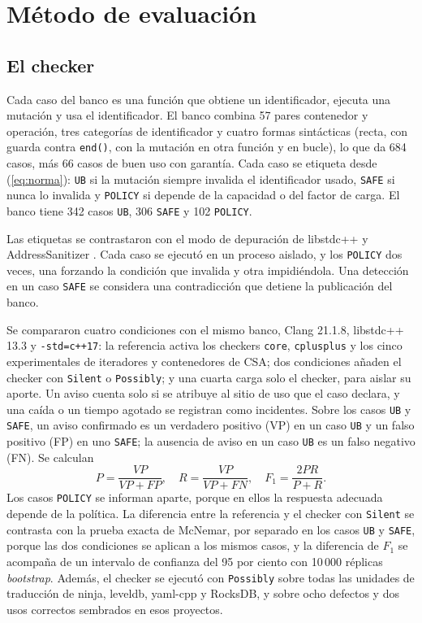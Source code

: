 \documentclass[conference]{IEEEtran}
\newcommand{\code}[1]{\texttt{#1}}
\begin{document}
\section{Método de evaluación}

\subsection{El checker}
Cada caso del banco es una función que obtiene un identificador, ejecuta una mutación y usa el identificador. El banco combina 57 pares contenedor y operación, tres categorías de identificador y cuatro formas sintácticas (recta, con guarda contra \code{end()}, con la mutación en otra función y en bucle), lo que da 684 casos, más 66 casos de buen uso con garantía. Cada caso se etiqueta desde (\ref{eq:norma}): \code{UB} si la mutación siempre invalida el identificador usado, \code{SAFE} si nunca lo invalida y \code{POLICY} si depende de la capacidad o del factor de carga. El banco tiene 342 casos \code{UB}, 306 \code{SAFE} y 102 \code{POLICY}.

Las etiquetas se contrastaron con el modo de depuración de libstdc++ \cite{libstdcxx} y AddressSanitizer \cite{asan}. Cada caso se ejecutó en un proceso aislado, y los \code{POLICY} dos veces, una forzando la condición que invalida y otra impidiéndola. Una detección en un caso \code{SAFE} se considera una contradicción que detiene la publicación del banco.

Se compararon cuatro condiciones con el mismo banco, Clang 21.1.8, libstdc++ 13.3 y \code{-std=c++17}: la referencia activa los checkers \code{core}, \code{cplusplus} y los cinco experimentales de iteradores y contenedores de CSA; dos condiciones añaden el checker con \code{Silent} o \code{Possibly}; y una cuarta carga solo el checker, para aislar su aporte. Un aviso cuenta solo si se atribuye al sitio de uso que el caso declara, y una caída o un tiempo agotado se registran como incidentes. Sobre los casos \code{UB} y \code{SAFE}, un aviso confirmado es un verdadero positivo (VP) en un caso \code{UB} y un falso positivo (FP) en uno \code{SAFE}; la ausencia de aviso en un caso \code{UB} es un falso negativo (FN). Se calculan
\begin{equation}
P=\frac{\mathit{VP}}{\mathit{VP}+\mathit{FP}},\quad R=\frac{\mathit{VP}}{\mathit{VP}+\mathit{FN}},\quad F_1=\frac{2PR}{P+R}.
\label{eq:metricas}
\end{equation}
Los casos \code{POLICY} se informan aparte, porque en ellos la respuesta adecuada depende de la política. La diferencia entre la referencia y el checker con \code{Silent} se contrasta con la prueba exacta de McNemar, por separado en los casos \code{UB} y \code{SAFE}, porque las dos condiciones se aplican a los mismos casos, y la diferencia de $F_1$ se acompaña de un intervalo de confianza del 95 por ciento con 10\,000 réplicas \textit{bootstrap}. Además, el checker se ejecutó con \code{Possibly} sobre todas las unidades de traducción de ninja, leveldb, yaml-cpp y RocksDB, y sobre ocho defectos y dos usos correctos sembrados en esos proyectos.
\end{document}
